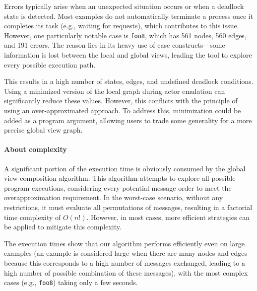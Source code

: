 Errors typically arise when an unexpected situation occurs or when a deadlock
state is detected. Most examples do not automatically terminate a process once
it completes its task (e.g., waiting for requests), which contributes to this
issue. However, one particularly notable case is \texttt{foo8}, which has 561
nodes, 560 edges, and 191 errors. The reason lies in its heavy use of case
constructs—some information is lost between the local and global views, leading
the tool to explore every possible execution path.

This results in a high number
of states, edges, and undefined deadlock conditions. 
Using a minimized version of the local graph during actor emulation can
significantly reduce these values. However, this conflicts with the principle
of using an over-approximated approach. To address this, minimization could be
added as a program argument, allowing users to trade some generality for a
more precise global view graph.

\paragraph{About complexity}
A significant portion of the execution time is obviously consumed by the global  
view composition algorithm. This algorithm attempts to explore all possible  
program executions, considering every potential message order to meet the  
overapproximation requirement. In the worst-case scenario, without any  
restrictions, it must evaluate all permutations of messages, resulting in a  
factorial time complexity of \( O(n!) \). However, in most cases, more efficient  
strategies can be applied to mitigate this complexity.

The execution times show that our algorithm performs efficiently even on large 
examples (an example is considered large when there are many nodes and edges
because this corresponds to a high number of messages exchanged, leading to a
high number of possible combination of these messages), with the most complex 
cases (e.g., \texttt{foo8}) taking only a few seconds.

